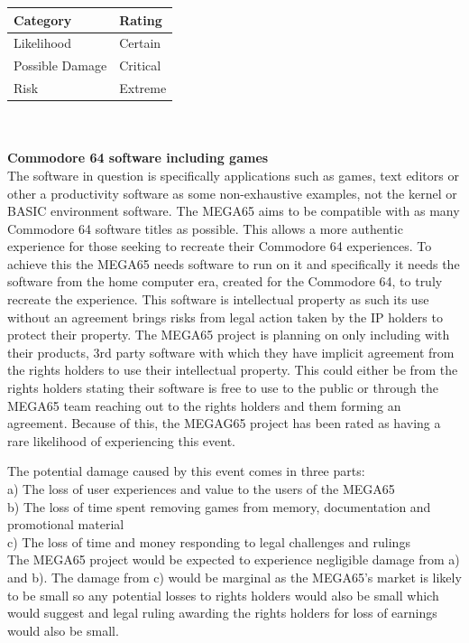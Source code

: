 \begin{tabular}{l|l} %
    	\textbf{Category} 	&	\textbf{Rating} \\
      \hline
     Likelihood			&	Certain \\
     Possible Damage 	& 	Critical \\
     Risk 				&	Extreme		\\	
    \end{tabular} \\ \\


\textbf{Commodore 64 software including games}\\
The software in question is specifically applications such as games, text editors or other a productivity software as some non-exhaustive examples, not the kernel or BASIC environment software. The MEGA65 aims to be compatible with as many Commodore 64 software titles as possible. This allows a more authentic experience for those seeking to recreate their Commodore 64 experiences. To achieve this the MEGA65 needs software to run on it and specifically it needs the software from the home computer era, created for the Commodore 64, to truly recreate the experience. This software is intellectual property as such its use without an agreement brings risks from legal action taken by the IP holders to protect their property. The MEGA65 project is planning on only including with their products, 3rd party software with which they have implicit agreement from the rights holders to use their intellectual property. This could either be from the rights holders stating their software is free to use to the public or through the MEGA65 team reaching out to the rights holders and them forming an agreement. Because of this, the MEGAG65 project has been rated as having a rare likelihood of experiencing this event. 

The potential damage caused by this event comes in three parts: \\
a) The loss of user experiences and value to the users of the MEGA65 \\
b) The loss of time spent removing games from memory, documentation and promotional material \\
c) The loss of time and money responding to legal challenges and rulings \\


The MEGA65 project would be expected to experience negligible damage from a) and b). The damage from c) would be marginal as the MEGA65's market is likely to be small so any potential losses to rights holders would also be small which would suggest and legal ruling awarding the rights holders for loss of earnings would also be small. \\

